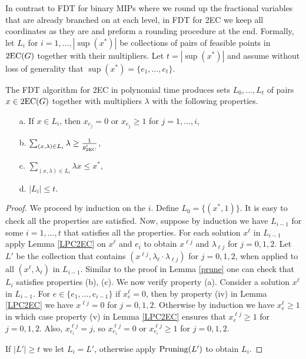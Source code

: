 In contrast to FDT for binary MIPs where we round up the fractional variables that are already branched on at each level, in FDT for 2EC we keep all coordinates as they are and preform a rounding procedure at the end. Formally, let $L_i$ for $i=1,\ldots,|\sup(x^*)|$ be collections of pairs of feasible points in $\operatorname{2EC}(G)$ together with their multipliers. Let $t=|\sup(x^*)|$ and assume without loss of generality that $\sup(x^*)=\{e_1,\ldots,e_t\}$. 

\begin{lemma}\label{2ecpruning}
	The FDT algorithm for 2EC in  polynomial time produces sets $L_0,\ldots,L_t$ of pairs $x\in \operatorname{2EC}(G)$ together with multipliers $\lambda$ with the following properties.
	\begin{enumerate}
			\item[a.] If $x\in L_i$, then $x_{e_j}=0$ or $x_{e_j}\geq 1$ for $j=1,\ldots,i$,
		\item [b.] $\sum_{(x,\lambda)\in L_i }\lambda \geq \frac{1}{g_{\operatorname{2EC}}^i}$,
		\item[c.]  $\sum_{(x,\lambda)\in L_i }\lambda x \leq x^*$,
		\item[d.] $|L_i|\leq t$.
		\end{enumerate}
\end{lemma}
\begin{proof}
	We proceed by induction on the $i$. Define $L_0=\{(x^*,1)\}$. It is easy to check all the properties are satisfied. Now, suppose by induction we have $L_{i-1}$ for some $i=1,\ldots,t$ that satisfies all the properties. For each solution $x^\ell$ in $L_{i-1}$ apply Lemma \ref{LPC2EC} on $x^\ell$ and $e_{i}$ to obtain $x^{\ell j}$ and $\lambda_{\ell j}$ for $j=0,1,2$. Let $L'$ be the collection that contains $(x^{\ell j},\lambda_\ell \cdot \lambda_{\ell j})$ for $j=0,1,2$, when applied to all $(x^\ell,\lambda_\ell)$ in $L_{i-1}$. Similar to the proof in Lemma \ref{prune} one can check that $L_i$ satisfies properties (b), (c). We now verify property (a). Consider a solution $x^\ell$ in $L_{i-1}$. For $e\in \{e_1,\ldots,e_{i-1}\}$ if $x^\ell_e =0$, then by property (iv) in Lemma \ref{LPC2EC} we have $x^{\ell j}=0$ for $j=0,1,2$. Otherwise by induction we have $x^{\ell}_{e}\geq 1$ in which case property (v) in Lemma \ref{LPC2EC} ensures that $x^{\ell j}_e\geq 1$ for $j=0,1,2$. Also, $x^{\ell j}_{e_i}= j$, so $x^{\ell j}_{e_i}=0$ or $x^{\ell j}_{e_i}\geq 1$ for $j=0,1,2$. 
	
	If $|L'|\geq t$ we let $L_i=L'$, otherwise apply $\operatorname{Pruning}(L')$ to obtain $L_{i}$.
\end{proof}	

